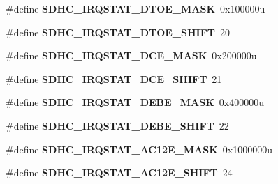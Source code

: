 \begin{DoxyCompactItemize}
\item 
\hypertarget{group___s_d_h_c___register___masks_ga1ddb5beb552cdc6193ebf649a9279bf9}{}\#define {\bfseries S\+D\+H\+C\+\_\+\+I\+R\+Q\+S\+T\+A\+T\+\_\+\+D\+T\+O\+E\+\_\+\+M\+A\+S\+K}~0x100000u\label{group___s_d_h_c___register___masks_ga1ddb5beb552cdc6193ebf649a9279bf9}

\item 
\hypertarget{group___s_d_h_c___register___masks_gac0dd3b95df6da3006bb082622a655b37}{}\#define {\bfseries S\+D\+H\+C\+\_\+\+I\+R\+Q\+S\+T\+A\+T\+\_\+\+D\+T\+O\+E\+\_\+\+S\+H\+I\+F\+T}~20\label{group___s_d_h_c___register___masks_gac0dd3b95df6da3006bb082622a655b37}

\item 
\hypertarget{group___s_d_h_c___register___masks_ga48e68fbecd65304dfca83a00e76f03f2}{}\#define {\bfseries S\+D\+H\+C\+\_\+\+I\+R\+Q\+S\+T\+A\+T\+\_\+\+D\+C\+E\+\_\+\+M\+A\+S\+K}~0x200000u\label{group___s_d_h_c___register___masks_ga48e68fbecd65304dfca83a00e76f03f2}

\item 
\hypertarget{group___s_d_h_c___register___masks_ga76f0e02634ba99e8b7dd3db03d6e9dc6}{}\#define {\bfseries S\+D\+H\+C\+\_\+\+I\+R\+Q\+S\+T\+A\+T\+\_\+\+D\+C\+E\+\_\+\+S\+H\+I\+F\+T}~21\label{group___s_d_h_c___register___masks_ga76f0e02634ba99e8b7dd3db03d6e9dc6}

\item 
\hypertarget{group___s_d_h_c___register___masks_gaff8f0d4c189f99dc324251e1c1486414}{}\#define {\bfseries S\+D\+H\+C\+\_\+\+I\+R\+Q\+S\+T\+A\+T\+\_\+\+D\+E\+B\+E\+\_\+\+M\+A\+S\+K}~0x400000u\label{group___s_d_h_c___register___masks_gaff8f0d4c189f99dc324251e1c1486414}

\item 
\hypertarget{group___s_d_h_c___register___masks_gaca30553c1983afb6604acc0468a3a7b9}{}\#define {\bfseries S\+D\+H\+C\+\_\+\+I\+R\+Q\+S\+T\+A\+T\+\_\+\+D\+E\+B\+E\+\_\+\+S\+H\+I\+F\+T}~22\label{group___s_d_h_c___register___masks_gaca30553c1983afb6604acc0468a3a7b9}

\item 
\hypertarget{group___s_d_h_c___register___masks_gaa084b3a11c48abfe299e0f4dd5e6522c}{}\#define {\bfseries S\+D\+H\+C\+\_\+\+I\+R\+Q\+S\+T\+A\+T\+\_\+\+A\+C12\+E\+\_\+\+M\+A\+S\+K}~0x1000000u\label{group___s_d_h_c___register___masks_gaa084b3a11c48abfe299e0f4dd5e6522c}

\item 
\hypertarget{group___s_d_h_c___register___masks_gaa438836d215d57b0c6284879f9460161}{}\#define {\bfseries S\+D\+H\+C\+\_\+\+I\+R\+Q\+S\+T\+A\+T\+\_\+\+A\+C12\+E\+\_\+\+S\+H\+I\+F\+T}~24\label{group___s_d_h_c___register___masks_gaa438836d215d57b0c6284879f9460161}


\end{DoxyCompactItemize}
